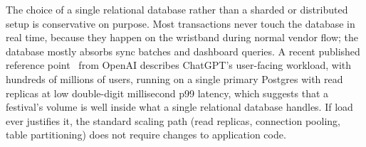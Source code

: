 The choice of a single relational database rather than a sharded or distributed setup is conservative on purpose. Most transactions never touch the database in real time, because they happen on the wristband during normal vendor flow; the database mostly absorbs sync batches and dashboard queries. A recent published reference point~\cite{OpenAIPostgres2026} from OpenAI describes ChatGPT's user-facing workload, with hundreds of millions of users, running on a single primary Postgres with read replicas at low double-digit millisecond p99 latency, which suggests that a festival's volume is well inside what a single relational database handles. If load ever justifies it, the standard scaling path (read replicas, connection pooling, table partitioning) does not require changes to application code.
